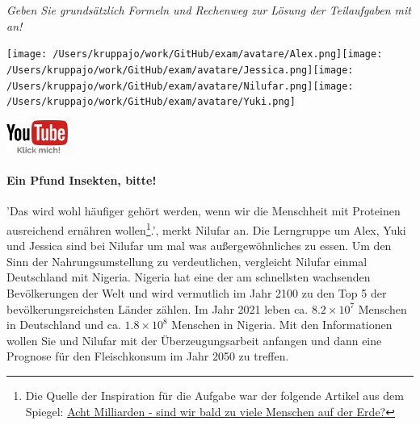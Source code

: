 \documentclass[a4paper, 9pt]{scrartcl}\usepackage[]{graphicx}\usepackage[]{xcolor}
\begin{document}
\textit{Geben Sie grundsätzlich Formeln und Rechenweg zur Lösung der Teilaufgaben mit an!} \\[1Ex]
 

 
\ifcollection
\begin{flushright}
\tiny\vspace{-3Ex}
\textbf{\examinhaltstart}
\exammodulemathstat
\vspace{-4Ex}
\end{flushright}
\begin{minipage}[t]{0.5\textwidth}
\texttt{[image: /Users/kruppajo/work/GitHub/exam/avatare/Alex.png]}\hspace{-4mm}\texttt{[image: /Users/kruppajo/work/GitHub/exam/avatare/Jessica.png]}\hspace{-4mm}\texttt{[image: /Users/kruppajo/work/GitHub/exam/avatare/Nilufar.png]}\hspace{-4mm}\texttt{[image: /Users/kruppajo/work/GitHub/exam/avatare/Yuki.png]}
\end{minipage}
\begin{minipage}[t]{0.5\textwidth}
\hfill
\href{https://youtu.be/OhyuH6hzEhY}{\includegraphics[width = 2cm]{img/youtube}}
\end{minipage}
\fi







\ifcollection
\paragraph{Ein Pfund Insekten, bitte!} 
\fi

'Das wird wohl häufiger gehört werden, wenn wir die Menschheit mit Proteinen ausreichend ernähren wollen\footnote{Die Quelle der Inspiration für die Aufgabe war der folgende Artikel aus dem Spiegel: \href{https://www.spiegel.de/ausland/ueberbevoelkerung-acht-milliarden-sind-wir-bald-zu-viele-menschen-auf-der-erde-a-3f20c7bc-3d60-4440-9f52-eb338db207f5}{Acht Milliarden - sind wir bald zu viele Menschen auf der Erde?}}.', merkt Nilufar an. Die Lerngruppe um Alex, Yuki und Jessica sind bei Nilufar um mal was außergewöhnliches zu essen. Um den Sinn der Nahrungsumstellung zu verdeutlichen, vergleicht Nilufar einmal Deutschland mit Nigeria. Nigeria hat eine der am schnellsten wachsenden Bevölkerungen der Welt und wird vermutlich im Jahr 2100 zu den Top 5 der bevölkerungsreichsten Länder zählen. Im Jahr 2021 leben ca. \ensuremath{8.2\times 10^{7}} Menschen in Deutschland und ca. \ensuremath{1.8\times 10^{8}} Menschen in Nigeria. Mit den Informationen wollen Sie und Nilufar mit der Überzeugungsarbeit anfangen und dann eine Prognose für den Fleischkonsum im Jahr 2050 zu treffen. \\ 
\end{document}
